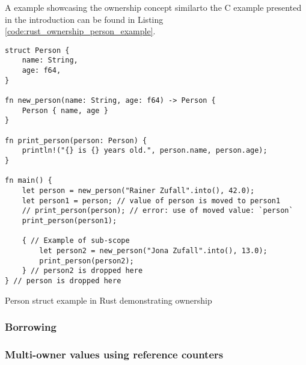 A example showcasing the ownership concept similar\footnotemark to the C example presented in the introduction
can be found in Listing \autoref{code:rust_ownership_person_example}.

\begin{listing}[H] 
    \begin{verbatim}
struct Person {
    name: String,
    age: f64,
}

fn new_person(name: String, age: f64) -> Person {
    Person { name, age }
}

fn print_person(person: Person) {
    println!("{} is {} years old.", person.name, person.age);
}

fn main() {
    let person = new_person("Rainer Zufall".into(), 42.0);
    let person1 = person; // value of person is moved to person1
    // print_person(person); // error: use of moved value: `person`
    print_person(person1);

    { // Example of sub-scope
        let person2 = new_person("Jona Zufall".into(), 13.0);
        print_person(person2);
    } // person2 is dropped here
} // person is dropped here
    \end{verbatim}
    \caption{Person struct example in Rust demonstrating ownership}
    \label{code:rust_ownership_person_example}
\end{listing}

\subsubsection{Borrowing}

\subsubsection{Multi-owner values using reference counters}
